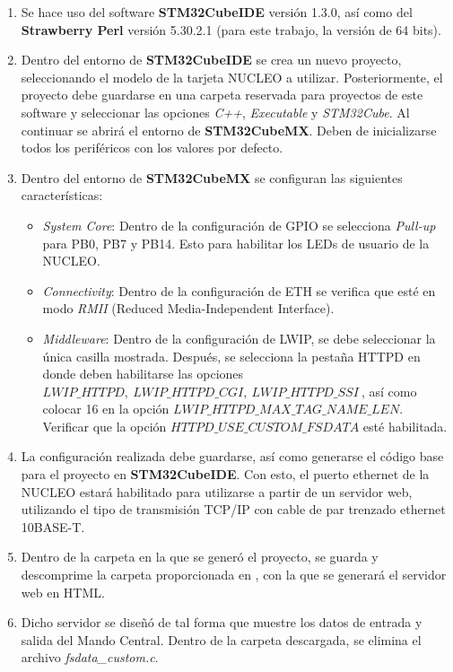 \begin{enumerate}
    \item Se hace uso del software \textbf{STM32CubeIDE} versión 1.3.0, así como del \textbf{Strawberry Perl} versión 5.30.2.1 (para este trabajo, la versión de 64 bits).
    \item Dentro del entorno de \textbf{STM32CubeIDE} se crea un nuevo proyecto, seleccionando el modelo de la tarjeta NUCLEO a utilizar. Posteriormente, el proyecto debe guardarse en una carpeta reservada para proyectos de este software y seleccionar las opciones \textit{C++}, \textit{Executable} y \textit{STM32Cube}. Al continuar se abrirá el entorno de \textbf{STM32CubeMX}. Deben de inicializarse todos los periféricos con los valores por defecto.
    \item Dentro del entorno de \textbf{STM32CubeMX} se configuran las siguientes características:
    \begin{itemize}
        \item \textit{System Core}: Dentro de la configuración de GPIO se selecciona \textit{Pull-up} para PB0, PB7 y PB14. Esto para habilitar los LEDs de usuario de la NUCLEO.
        \item \textit{Connectivity}: Dentro de la configuración de ETH se verifica que esté en modo \textit{RMII} (Reduced Media-Independent Interface).
        \item \textit{Middleware}: Dentro de la configuración de LWIP, se debe seleccionar la única casilla mostrada. Después, se selecciona la pestaña HTTPD en donde deben habilitarse las opciones $ LWIP\_HTTPD,\  LWIP\_HTTPD\_CGI,\ LWIP\_HTTPD\_SSI\ $, así como colocar 16 en la opción $ LWIP\_HTTPD\_MAX\_TAG\_NAME\_LEN $. Verificar que la opción $ HTTPD\_USE\_CUSTOM\_FSDATA $ esté habilitada.
    \end{itemize}
    \item La configuración realizada debe guardarse, así como generarse el código base para el proyecto en \textbf{STM32CubeIDE}. Con esto, el puerto ethernet de la NUCLEO estará habilitado para utilizarse a partir de un servidor web, utilizando el tipo de transmisión TCP/IP con cable de par trenzado ethernet 10BASE-T.
    \item Dentro de la carpeta en la que se generó el proyecto, se guarda y descomprime la carpeta proporcionada en \cite{DDC10}, con la que se generará el servidor web en HTML.
    \item Dicho servidor se diseñó de tal forma que muestre los datos de entrada y salida del Mando Central. Dentro de la carpeta descargada, se elimina el archivo \textit{fsdata\_custom.c}.

\end{enumerate}
